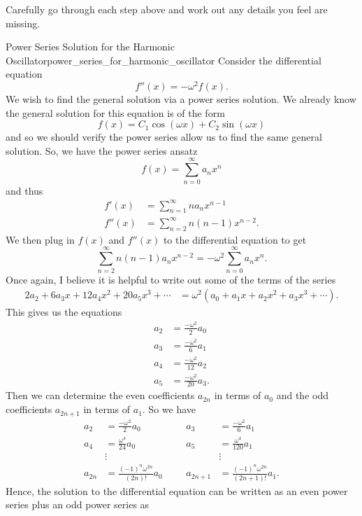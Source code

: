 \begin{exercise}
Carefully go through each step above and work out any details you feel are missing.
\end{exercise}

\begin{ex}{Power Series Solution for the Harmonic Oscillator}{power_series_for_harmonic_oscillator}
Consider the differential equation
\[
f''(x) = -\omega^2 f(x).
\]
We wish to find the general solution via a power series solution. We already know the general solution for this equation is of the form
\[
f(x)=C_1 \cos(\omega x)+C_2 \sin(\omega x)
\]
and so we should verify the power series allow us to find the same general solution.  So, we have the power series ansatz
\[
f(x) = \sum_{n=0}^\infty a_n x^n
\]
and thus
\begin{align*}
    f'(x) &= \sum_{n=1}^\infty na_n x^{n-1}\\
    f''(x)&= \sum_{n=2}^\infty n(n-1) x^{n-2}.
\end{align*}
We then plug in $f(x)$ and $f''(x)$ to the differential equation to get
\[
\sum_{n=2}^\infty n(n-1)a_n x^{n-2} = -\omega^2 \sum_{n=0}^\infty a_n x^n.
\]
Once again, I believe it is helpful to write out some of the terms of the series
\begin{align*}
    2a_2 +6a_3 x + 12 a_4 x^2 + 20 a_5 x^3 + \cdots &= \omega^2 (a_0 + a_1 x + a_2 x^2 + a_3 x^3 + \cdots ).
\end{align*}
This gives us the equations
\begin{align*}
a_2 &= \frac{-\omega^2}{2} a_0\\
a_3 &= \frac{-\omega^2}{6} a_1\\
a_4 &= \frac{-\omega^2}{12} a_2\\
a_5 &= \frac{-\omega^2}{20} a_3.
\end{align*}
Then we can determine the even coefficients $a_{2n}$ in terms of $a_0$ and the odd coefficients $a_{2n+1}$ in terms of $a_1$.  So we have
\begin{align*}
    a_2 &= \frac{-\omega^2}{2} a_0 &&& a_3 &= \frac{-\omega^2}{6} a_1\\
    a_4 &= \frac{\omega^4}{24} a_0 &&& a_5 &= \frac{\omega^4}{120} a_1\\
    &\vdots &&& &\vdots\\
    a_{2n} &= \frac{(-1)^n\omega^{2n}}{(2n)!}a_0 &&& a_{2n+1} &= \frac{(-1)^n\omega^{2n}}{(2n+1)!} a_1.
\end{align*}
Hence, the solution to the differential equation can be written as an even power series plus an odd power series as

\end{ex}
